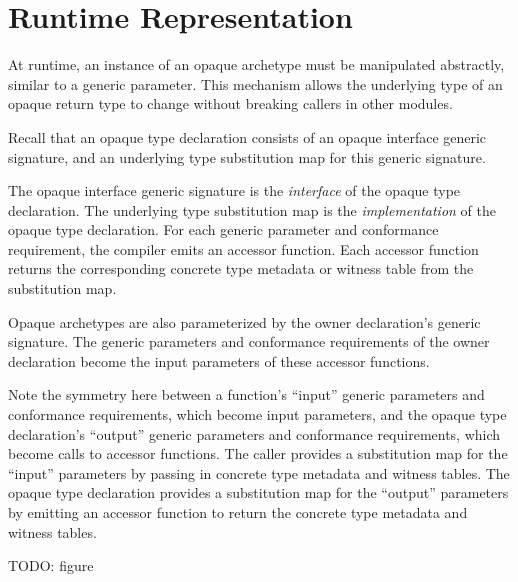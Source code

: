 \documentclass[a4paper,headsepline,bibliography=totoc,toc=flat,fleqn,twoside=semi]{scrbook}
\theoremstyle{definition}
\theoremstyle{definition}
\theoremstyle{definition}
\begin{document}
\section{Runtime Representation}

At runtime, an instance of an opaque archetype must be manipulated abstractly, similar to a generic parameter. This mechanism allows the underlying type of an opaque return type to change without breaking callers in other modules.

Recall that an opaque type declaration consists of an opaque interface generic signature, and an underlying type substitution map for this generic signature.

The opaque interface generic signature is the \emph{interface} of the opaque type declaration. The underlying type substitution map is the \emph{implementation} of the opaque type declaration. For each generic parameter and conformance requirement, the compiler emits an accessor function. Each accessor function returns the corresponding concrete type metadata or witness table from the substitution map.

Opaque archetypes are also parameterized by the owner declaration's generic signature. The generic parameters and conformance requirements of the owner declaration become the input parameters of these accessor functions.

Note the symmetry here between a function's ``input'' generic parameters and conformance requirements, which become input parameters, and the opaque type declaration's ``output'' generic parameters and conformance requirements, which become calls to accessor functions. The caller provides a substitution map for the ``input'' parameters by passing in concrete type metadata and witness tables. The opaque type declaration provides a substitution map for the ``output'' parameters by emitting an accessor function to return the concrete type metadata and witness tables.

TODO: figure
\end{document}
